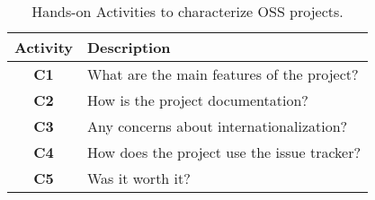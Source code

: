 \begin{table}[htb]
    \caption{Hands-on Activities to characterize OSS projects.} \label{tab:activities}
    \begin{tabular}{c|l}
       \textbf{Activity} & \textbf{Description} \\
    \hline
        \textbf{C1} & What are the main features of the project? \\
        \textbf{C2} & How is the project documentation? \\
        \textbf{C3} & Any concerns about internationalization?  \\
        \textbf{C4} & How does the project use the issue tracker?  \\
        \textbf{C5} & Was it worth it?  \\
    \hline
    \end{tabular}
\end{table}
